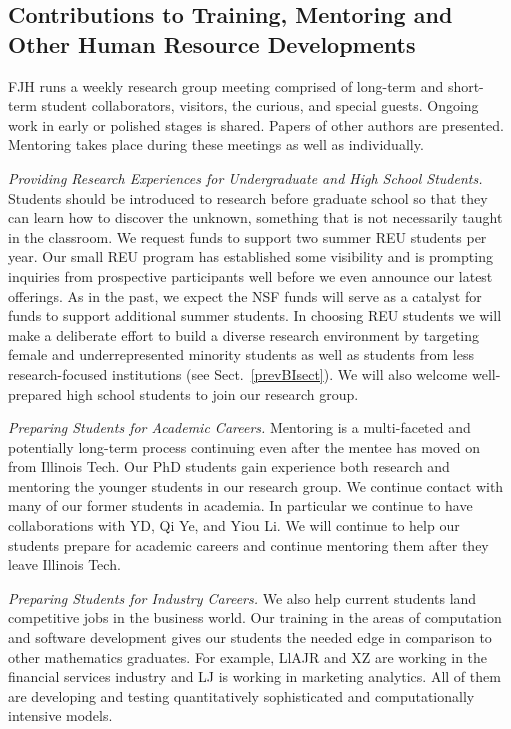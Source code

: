 \documentclass[11pt]{NSFamsart}
\begin{document}
\subsection{Contributions to Training, Mentoring and Other Human Resource Developments}
FJH runs a weekly research group meeting comprised of long-term and short-term student 
collaborators, 
visitors, the curious, and special guests.  Ongoing work in early or polished stages is shared.  Papers 
of other authors are presented.  Mentoring takes place during these meetings as well as individually.

\emph{Providing Research Experiences for Undergraduate and High School Students.} Students 
should be introduced to research before graduate school so that they can learn how to 
discover the unknown, something that is not necessarily taught in the classroom. We request funds 
to 
support two summer REU students per year.  Our small REU program has established some visibility 
and is prompting inquiries from prospective participants well before we 
even announce our latest 
offerings. As in the past, we expect the NSF funds will serve as a catalyst for funds to 
support additional summer students. In choosing REU students we will make a deliberate effort to 
build 
a diverse research environment by targeting female and underrepresented minority students as well 
as students from less research-focused institutions (see Sect.~\ref{prevBIsect}). We will also 
welcome well-prepared high school students to join our research group.

\emph{Preparing Students for Academic Careers.} Mentoring is a multi-faceted and 
potentially long-term process continuing even after the mentee has moved on from Illinois Tech.  
Our PhD students gain experience both research and mentoring the younger students in our 
research group.  We 
continue contact with many of our former students in academia.  In particular we continue to have 
collaborations with YD, Qi Ye, and Yiou Li.  We will continue to help our students prepare for 
academic careers and continue mentoring them after they leave Illinois Tech.

\emph{Preparing Students for Industry Careers.}
We also help current students land 
competitive jobs in the business world. Our training in the areas of computation and software 
development gives our students the needed edge in comparison to other mathematics 
graduates. For example, LlAJR and XZ are working in the financial services industry and  LJ is 
working in marketing analytics.  All of them are developing and testing quantitatively sophisticated 
and computationally intensive models.
\end{document}
